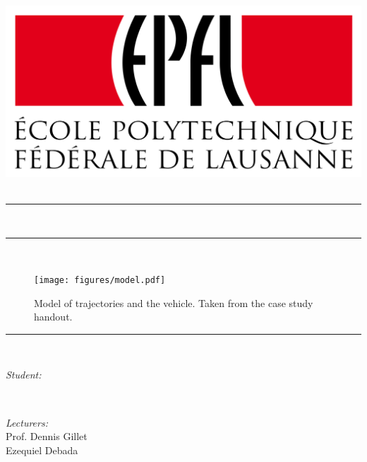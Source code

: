 \begin{titlepage}

\makeatletter
\let\thetitle\@title
\let\theauthor\@author
\let\thedate\@date
\let\thesubtitle\@subtitle
\makeatother

\centering
\vspace*{0.5 cm}

    \includegraphics[width=0.6\linewidth]{figures/EPFL_Logo.png}\\[1.0 cm]	
	\textsc{\Large\thesubtitle}\\[1.0cm]				
	\rule{\linewidth}{0.2 mm} %
	{ \LARGE \thetitle}\\
	\rule{\linewidth}{0.2 mm} \\ %
\begin{figure}[h]
	\centering
	\texttt{[image: figures/model.pdf]}
	\caption{Model of trajectories and the vehicle. Taken from the case study handout.}
	\label{fig:vehicle_model}
\end{figure}
	\rule{\linewidth}{0.2 mm} \\[1.5 cm]

	\begin{minipage}{0.5\textwidth}
		\begin{flushleft} \large
			\emph{{Student}:}\\
			\theauthor
			\end{flushleft}
			\end{minipage}~
			\begin{minipage}{0.4\textwidth}
			\begin{flushright} \large
			\emph{{Lecturers}:} \\	
			Prof. Dennis Gillet \\ Ezequiel Debada  \\
		\end{flushright}
	\end{minipage} \\ %
	{\vspace{3cm} \large \thedate}\\[1.5 cm]
	\vfill
\end{titlepage}
